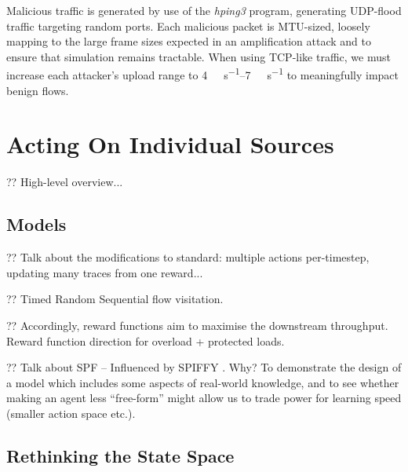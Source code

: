 \documentclass[conference, letterpaper, 10pt, times]{IEEEtran}
\begin{document}
Malicious traffic is generated by use of the \emph{hping3} program, generating UDP-flood traffic targeting random ports.
Each malicious packet is MTU-sized, loosely mapping to the large frame sizes expected in an amplification attack and to ensure that simulation remains tractable.
When using TCP-like traffic, we must increase each attacker's upload range to \SIrange{4}{7}{\mega\bit\per\second} to meaningfully impact benign flows.

\section{Acting On Individual Sources}

?? High-level overview...

\subsection{Models}

?? Talk about the modifications to standard: multiple actions per-timestep, updating many traces from one reward...

?? Timed Random Sequential flow visitation.

?? Accordingly, reward functions aim to maximise the downstream throughput. Reward function direction for overload + protected loads.

?? Talk about SPF -- Influenced by SPIFFY \cite{DBLP:conf/ndss/KangGS16}. Why? To demonstrate the design of a model which includes some aspects of real-world knowledge, and to see whether making an agent less ``free-form'' might allow us to trade power for learning speed (smaller action space etc.).

\subsection{Rethinking the State Space}\label{sec:rethinking-the-state-space}
\end{document}
